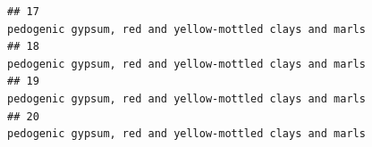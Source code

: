 \documentclass[]{article}
\begin{document}
\begin{verbatim}
## 17                                                                                                                                                                                                                                                                                                                                                                                                                                                                                                                                                                                                                                         pedogenic gypsum, red and yellow-mottled clays and marls
## 18                                                                                                                                                                                                                                                                                                                                                                                                                                                                                                                                                                                                                                         pedogenic gypsum, red and yellow-mottled clays and marls
## 19                                                                                                                                                                                                                                                                                                                                                                                                                                                                                                                                                                                                                                         pedogenic gypsum, red and yellow-mottled clays and marls
## 20                                                                                                                                                                                                                                                                                                                                                                                                                                                                                                                                                                                                                                         pedogenic gypsum, red and yellow-mottled clays and marls

\end{verbatim}
\end{document}
